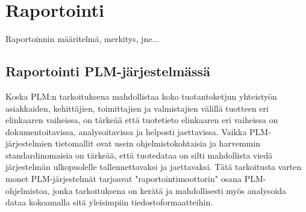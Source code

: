 \section{Raportointi}

Raportoinnin määritelmä, merkitys, jne...

\subsection{Raportointi PLM-järjestelmässä}

Koska PLM:n tarkoituksena mahdollistaa koko tuotantoketjun yhteistyön asiakkaiden, kehittäjien, toimittajien ja valmistajien välillä tuotteen eri elinkaaren vaiheissa, \cite{bouhaddou_plm_2012} on tärkeää että tuotetieto elinkaaren eri vaiheissa on dokumentoitavissa, analysoitavissa ja helposti jaettavissa. Vaikka PLM-järjestelmien tietomallit ovat usein ohjelmistokohtaisia ja harvemmin standardinomaisia \cite{SritiMohamed-Foued2012PTaS} on tärkeää, että tuotedataa on silti mahdollista viedä järjestelmän ulkopuolelle tallennettavaksi ja jaettavaksi. Tätä tarkoitusta varten monet PLM-järjestelmät tarjoavat "raportointimoottorin" osana PLM-ohjelmistoa, jonka tarkoituksena on kerätä ja mahdollisesti myös analysoida dataa kokoamalla sitä yleisimpiin tiedostoformaatteihin.
